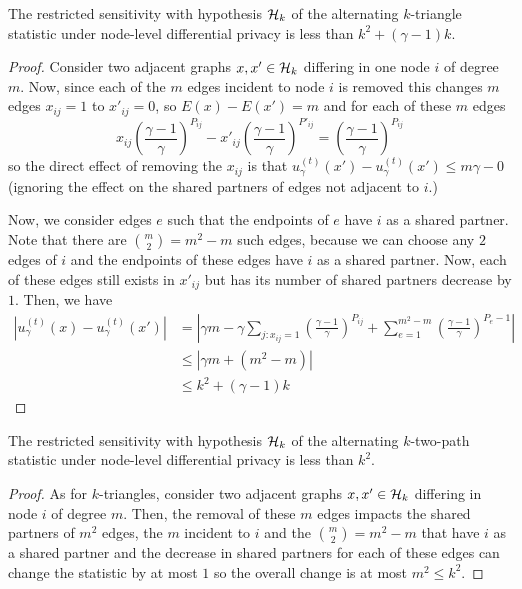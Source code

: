 \begin{claim}
The restricted sensitivity with hypothesis $\mathcal{H}_k$ of the alternating $k$-triangle statistic under node-level differential privacy is less than $k^2 + (\gamma - 1) k$.
\end{claim}
\begin{proof}
Consider two adjacent graphs $x, x'\in \mathcal{H}_k$ differing in one node $i$ of degree $m$. Now, since each of the $m$ edges incident to node $i$ is removed this changes $m$ edges $x_{ij} = 1$ to $x'_{ij} = 0$, so $E(x) - E(x') = m$ and for each of these $m$ edges 
$$ x_{ij} \left( \frac{\gamma - 1}{\gamma}\right)^{P_{ij}} - x'_{ij} \left( \frac{\gamma - 1}{\gamma}\right)^{P'_{ij}} = \left( \frac{\gamma - 1}{\gamma}\right)^{P_{ij}} $$ so the direct effect of removing the $x_{ij}$ is that $u_\gamma^{(t)}(x') - u_\gamma^{(t)}(x') \leq m \gamma -0$ (ignoring the effect on the shared partners of edges not adjacent to $i$.)

Now, we consider edges $e$ such that the endpoints of $e$ have $i$ as a shared partner. Note that there are $\binom{m}{2} = m^2 - m$ such edges, because we can choose any $2$ edges of $i$ and the endpoints of these edges have $i$ as a shared partner. Now, each of these edges still exists in $x'_{ij}$ but has its number of shared partners decrease by $1$. Then, we have 
\begin{align*}
|u_\gamma^{(t)}(x) - u_\gamma^{(t)}(x')| &= \left|\gamma m - \gamma \sum_{j: x_{ij} = 1}\left(\frac{\gamma-1}{\gamma} \right)^{P_{ij}}  + \sum_{e= 1}^{m^2 - m}  \left(\frac{\gamma-1}{\gamma} \right)^{P_e-1}    \right|\\
& \leq |\gamma m + (m^2 - m)|\\
& \leq k^2 +  (\gamma - 1)k 
\end{align*}
\end{proof}

\begin{claim}
The restricted sensitivity with hypothesis $\mathcal{H}_k$ of the alternating $k$-two-path statistic under node-level differential privacy is less than $k^2$. 
\end{claim}
\begin{proof}
As for $k$-triangles, consider two adjacent graphs $x, x' \in \mathcal{H}_k$ differing in node $i$ of degree $m$. Then, the removal of these $m$ edges impacts the shared partners of $m^2$ edges, the $m$ incident to $i$ and the $\binom{m}{2} = m^2 - m$ that have $i$ as a shared partner and the decrease in shared partners for each of these edges can change the statistic by at most $1$ so the overall change is at most $m^2 \leq k^2$.
\end{proof}

